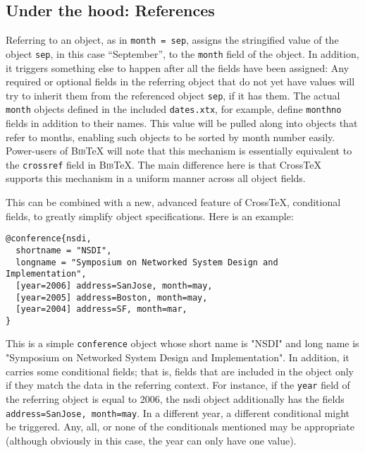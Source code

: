 \documentclass{article}
\newcommand{\XTeX}{Cross\TeX}
\newcommand{\BibTeX}{\textsc{Bib}\TeX}
\begin{document}
\subsection{Under the hood: References}

Referring to an object, as in \texttt{month = sep}, assigns the stringified value of the object \texttt{sep}, in this case ``September'', to the \texttt{month} field of the object. In addition, it triggers something else to happen after all the fields have been assigned: Any required or optional fields in the referring object that do not yet have values will try to inherit them from the referenced object \texttt{sep}, if it has them. The actual \texttt{month} objects defined in the included \texttt{dates.xtx}, for example, define \texttt{monthno} fields in addition to their names. This value will be pulled along into objects that refer to months, enabling such objects to be sorted by month number easily. Power-users of \BibTeX{} will note that this mechanism is essentially equivalent to the \texttt{crossref} field in \BibTeX{}. The main difference here is that \XTeX{} supports this mechanism in a uniform manner across all object fields.

This can be combined with a new, advanced feature of \XTeX{}, conditional fields, to greatly simplify object specifications. Here is an example:

\begin{small}\begin{verbatim}
@conference{nsdi,
  shortname = "NSDI",
  longname = "Symposium on Networked System Design and Implementation", 
  [year=2006] address=SanJose, month=may,
  [year=2005] address=Boston, month=may,
  [year=2004] address=SF, month=mar,
}
\end{verbatim}\end{small}

This is a simple \texttt{conference} object whose short name is "NSDI"
and long name is "Symposium on Networked System Design and
Implementation". In addition, it carries some conditional fields; that is, 
fields that are included in the object only if they match the data in the
referring context. For instance, if the \texttt{year} field of the referring object is equal to 2006, the nsdi object additionally has the fields \texttt{address=SanJose, month=may}. In a different year, a different conditional might be triggered. Any, all, or none of the conditionals mentioned may be appropriate (although obviously in this case, the year can only have one value).
\end{document}
